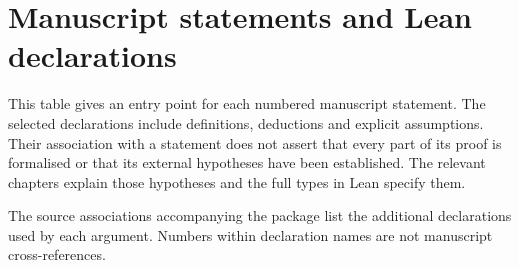 \chapter{Manuscript statements and Lean declarations}
\label{chap:current-statements}

This table gives an entry point for each numbered manuscript statement.
The selected declarations include definitions, deductions and explicit
assumptions. Their association with a statement does not assert that every
part of its proof is formalised or that its external hypotheses have been
established. The relevant chapters explain those hypotheses and the full
types in Lean specify them.

The source associations accompanying the package list the additional
declarations used by each argument. Numbers within declaration names are
not manuscript cross-references.

